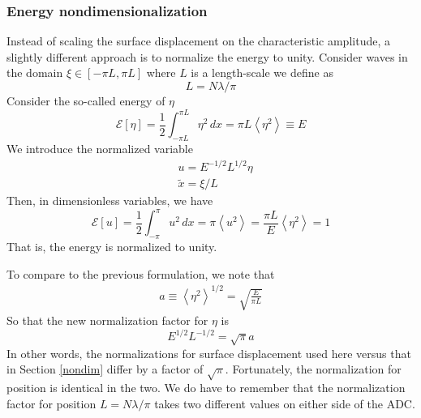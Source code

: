 \documentclass[11pt]{article}
\newcommand{\mean}[1]{\left< #1 \right>}
\newcommand{\amp}{a}
\newcommand{\lam}{\lambda}
\newcommand{\lamfac}{N}
\newcommand{\En}{\mathcal{E}}
\newcommand{\dx}{\, dx}
\begin{document}
\subsubsection{Energy nondimensionalization}

Instead of scaling the surface displacement on the characteristic amplitude, a slightly different approach is to normalize the energy to unity. Consider waves in the domain $\xi \in [-\pi L, \pi L]$ where $L$ is a length-scale we define as
\begin{equation}
L = \lamfac \lam / \pi
\end{equation}
Consider the so-called energy of $\eta$
\begin{equation}
\En [\eta] = \frac{1}{2} \int_{-\pi L}^{\pi L} \eta^2 \dx = \pi L \mean{\eta^2} \equiv E
\end{equation}
We introduce the normalized variable
\begin{align}
&u = E^{-1/2}L^{1/2} \eta \\
&\tilde{x} = \xi/L
\end{align}
Then, in dimensionless variables, we have
\begin{equation}
\En [u] = \frac{1}{2} \int_{-\pi}^{\pi} u^2 \dx = \pi \mean{u^2} = \frac{\pi L}{E} \mean{\eta^2} = 1
\end{equation}
That is, the energy is normalized to unity.

To compare to the previous formulation, we note that
\begin{align}
\amp \equiv \mean{\eta^2}^{1/2} = \sqrt{ \frac{E}{\pi L} }
\end{align}
So that the new normalization factor for $\eta$ is
\begin{equation}
E^{1/2}L^{-1/2} = \sqrt{\pi} \amp
\end{equation}
In other words, the normalizations for surface displacement used here versus that in Section \ref{nondim}
 differ by a factor of $\sqrt{\pi}$. Fortunately, the normalization for position is identical in the two. We do have to remember that the normalization factor for position $L = \lamfac \lam / \pi$ takes two different values on either side of the ADC.
\end{document}
